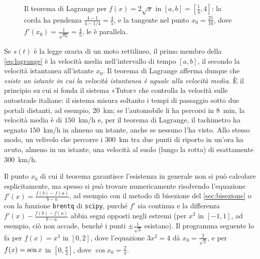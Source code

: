 \begin{figure}[htb]
\centering
{}
\caption{Il teorema di Lagrange per $f(x)=2\sqrt x$ in $[a,b]=[\frac14,4]$: la corda ha
pendenza $\frac{4-1}{4-1/4}=\frac45$, e la tangente nel punto $x_{0}=\frac{25}{16}$, dove
$f'(x_{0})=\frac1{\sqrt{x_{0}}}=\frac45$, le è parallela.}
\label{fig:lagrange}
\end{figure}

\begin{idea}
Se $s(t)$ è la legge oraria di un moto rettilineo, il primo membro della
\eqref{eq:lagrange} è la velocità media nell'intervallo di tempo $[a,b]$, il secondo la
velocità istantanea all'istante $x_{0}$. Il teorema di Lagrange afferma dunque che
\emph{esiste un istante in cui la velocità istantanea è uguale alla velocità media}.
È il principio su cui si fonda il sistema «Tutor» che controlla la velocità sulle
autostrade italiane: il sistema misura soltanto i tempi di passaggio sotto due portali
distanti, ad esempio, $20$~km; se l'automobile li ha percorsi in $8$~min, la
velocità media è di $150$~km/h e, per il teorema di Lagrange, il tachimetro ha
segnato $150$~km/h in almeno un istante, anche se nessuno l'ha visto. Allo stesso
modo, un velivolo che percorre i $300$~km tra due punti di riporto in un'ora ha
avuto, almeno in un istante, una velocità al suolo (lungo la rotta) di esattamente
$300$~km/h.
\end{idea}

Il punto $x_{0}$ di cui il teorema garantisce l'esistenza in generale non si può
calcolare esplicitamente, ma spesso si può trovare numericamente risolvendo
l'equazione $f'(x)=\frac{f(b)-f(a)}{b-a}$, ad esempio con il metodo di bisezione del
\cref{sec:bisezione} o con la funzione \texttt{brentq} di \texttt{scipy}, purché $f'$
sia continua e la differenza $f'(x)-\frac{f(b)-f(a)}{b-a}$ abbia segni opposti negli
estremi (per $x^{3}$ in $[-1,1]$, ad esempio, ciò non accade, benché i punti
$\pm\frac1{\sqrt3}$ esistano). Il programma
seguente lo fa per $f(x)=x^{3}$ in $[0,2]$, dove l'equazione $3x^{2}=4$ dà
$x_{0}=\frac2{\sqrt3}$, e per $f(x)=\operatorname{sen} x$ in $[0,\frac\pi2]$, dove $\cos x_{0}=\frac2\pi$.

